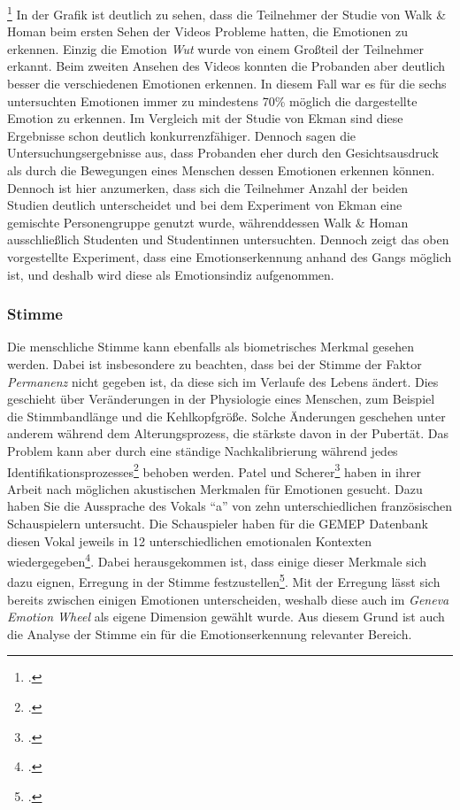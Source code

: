 \footcitetext[siehe. ][Tabelle 1 S.438]{Wal84}
\newline
In der Grafik ist deutlich zu sehen, dass die Teilnehmer der Studie von Walk \& Homan beim ersten Sehen der Videos Probleme hatten, die Emotionen zu erkennen. Einzig die Emotion \textit{Wut} wurde von einem Großteil der Teilnehmer erkannt. Beim zweiten Ansehen des Videos konnten die Probanden aber deutlich besser die verschiedenen Emotionen erkennen. In diesem Fall war es für die sechs untersuchten Emotionen immer zu mindestens 70\% möglich die dargestellte Emotion zu erkennen. Im Vergleich mit der Studie von Ekman sind diese Ergebnisse schon deutlich konkurrenzfähiger. Dennoch sagen die Untersuchungsergebnisse aus, dass Probanden eher durch den Gesichtsausdruck als durch die Bewegungen eines Menschen dessen Emotionen erkennen können. Dennoch ist hier anzumerken, dass sich die Teilnehmer Anzahl der beiden Studien deutlich unterscheidet und bei dem Experiment von Ekman eine gemischte Personengruppe genutzt wurde, währenddessen Walk \& Homan ausschließlich Studenten und Studentinnen untersuchten.\newline
Dennoch zeigt das oben vorgestellte Experiment, dass eine Emotionserkennung anhand des Gangs möglich ist, und deshalb wird diese als Emotionsindiz aufgenommen.
\subsubsection{Stimme}
Die menschliche Stimme kann ebenfalls als biometrisches Merkmal gesehen werden. Dabei ist insbesondere zu beachten, dass bei der Stimme der Faktor \textit{Permanenz} nicht gegeben ist, da diese sich im Verlaufe des Lebens ändert. Dies geschieht über Veränderungen in der Physiologie eines Menschen, zum Beispiel die Stimmbandlänge und die Kehlkopfgröße. Solche Änderungen geschehen unter anderem während dem Alterungsprozess, die stärkste davon in der Pubertät. Das Problem kann aber durch eine ständige Nachkalibrierung während jedes Identifikationsprozesses\footcite[Vgl. ][S.198 Z.22-26]{Til11} behoben werden.\newline
Patel und Scherer\footcite{Pat18} haben in ihrer Arbeit nach möglichen akustischen Merkmalen für Emotionen gesucht. Dazu haben Sie die Aussprache des Vokals ``a'' von zehn unterschiedlichen französischen Schauspielern untersucht. Die Schauspieler haben für die GEMEP Datenbank diesen Vokal jeweils in 12 unterschiedlichen emotionalen Kontexten wiedergegeben\footcite[Vgl. ][S.2 Z.13-16]{Pat18}. Dabei herausgekommen ist, dass einige dieser Merkmale sich dazu eignen, Erregung in der Stimme festzustellen\footcite[Vgl. ][S.4 Z.28-32]{Pat18}. Mit der Erregung lässt sich bereits zwischen einigen Emotionen unterscheiden, weshalb diese auch im \textit{Geneva Emotion Wheel} als eigene Dimension gewählt wurde. Aus diesem Grund ist auch die Analyse der Stimme ein für die Emotionserkennung relevanter Bereich.
